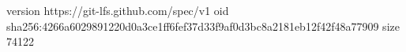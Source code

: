 version https://git-lfs.github.com/spec/v1
oid sha256:4266a6029891220d0a3ce1ff6fef37d33f9af0d3bc8a2181eb12f42f48a77909
size 74122

